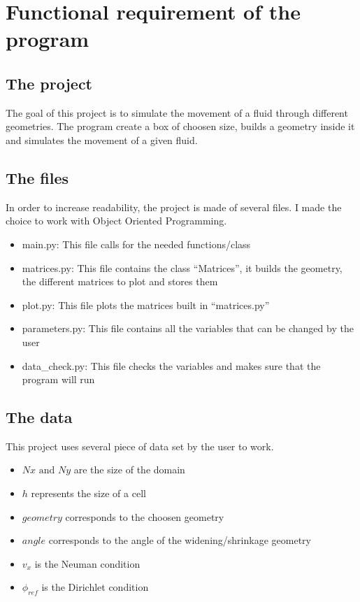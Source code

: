 \section{Functional requirement of the program}
\subsection{The project}
The goal of this project is to simulate the movement of a fluid through
different geometries. The program create a box of choosen size, builds a
geometry inside it and simulates the movement of a given fluid.
\subsection{The files}
In order to increase readability, the project is made of several files.
I made the choice to work with Object Oriented Programming.
\begin{itemize}
    \item main.py: This file calls for the needed functions/class
    \item matrices.py: This file contains the class ``Matrices'', it builds the
          geometry, the different matrices to plot and stores them
    \item plot.py: This file plots the matrices built in ``matrices.py''
    \item parameters.py: This file contains all the variables that can be 
          changed by the user
    \item data\_check.py: This file checks the variables and makes sure that
          the program will run
\end{itemize}
\subsection{The data}
This project uses several piece of data set by the user to work.
\begin{itemize}
    \item $Nx \text{ and } Ny$ are the size of the domain
    \item $h$ represents the size of a cell
    \item $geometry$ corresponds to the choosen geometry
    \item $angle$ corresponds to the angle of the widening/shrinkage geometry
    \item $v_x$ is the Neuman condition
    \item $\phi_{ref}$ is the Dirichlet condition
\end{itemize}

